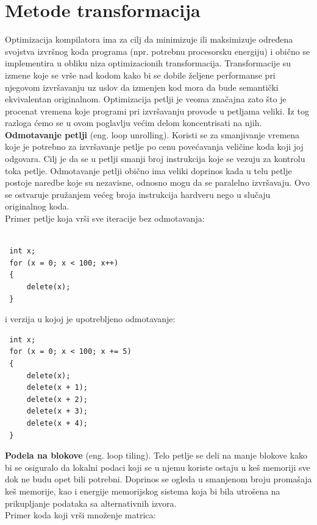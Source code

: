 \documentclass[a4paper]{article}
\begin{document}
\section{Metode transformacija}
\label{sec:transformacije}

Optimizacija kompilatora ima za cilj da minimizuje ili maksimizuje određena svojstva izvršnog koda programa (npr. potrebnu procesorsku energiju) i obično se implementira u obliku niza optimizacionih transformacija. Transformacije su izmene koje se vrše nad kodom kako bi se dobile željene performanse pri njegovom izvršavanju uz uslov da izmenjen kod mora da bude semantički ekvivalentan originalnom. Optimizacija petlji je veoma značajna zato što je procenat vremena koje programi pri izvršavanju provode u petljama veliki. Iz tog razloga ćemo se u ovom poglavlju većim delom koncentrisati na njih.  \\

\textbf{Odmotavanje petlji} (eng. loop unrolling). Koristi se za smanjivanje vremena koje je potrebno za
izvršavanje petlje po cenu povećavanja veličine koda koji joj odgovara. Cilj je da se u petlji
smanji broj instrukcija koje se vezuju za kontrolu toka petlje. Odmotavanje petlji obično ima
veliki doprinos kada u telu petlje postoje naredbe koje su nezavisne, odnosno mogu da se
paralelno izvršavaju. Ovo se ostvaruje pružanjem većeg broja instrukcija hardveru nego u 
slučaju originalnog koda.\\
Primer petlje koja vrši sve iteracije bez odmotavanja:
\begin{lstlisting}

 int x;
 for (x = 0; x < 100; x++)
 {
     delete(x);
 }
\end{lstlisting}
i verzija u kojoj je upotrebljeno odmotavanje:
\begin{lstlisting}
 int x; 
 for (x = 0; x < 100; x += 5)
 {
     delete(x);
     delete(x + 1);
     delete(x + 2);
     delete(x + 3);
     delete(x + 4);
 }
\end{lstlisting}


\textbf{Podela na blokove} (eng. loop tiling). Telo petlje se deli na manje blokove kako bi se osiguralo
da lokalni podaci koji se u njemu koriste ostaju u keš memoriji sve dok ne budu opet bili potrebni.
Doprinos se ogleda u smanjenom broju promašaja keš memorije, kao i energije memorijskog sistema koja
bi bila utrošena na prikupljanje podataka sa alternativnih izvora.\\
Primer koda koji vrši množenje matrica:
\end{document}
